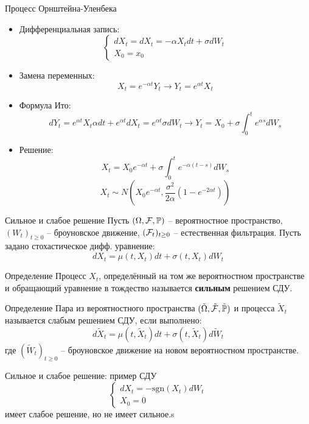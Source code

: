 \documentclass{beamer}
\begin{document}
\begin{frame}{Процесс Орнштейна-Уленбека}
\begin{itemize}
    \item Дифференциальная запись:    
    $$ \begin{cases}
            dX_t = d X_t = -\alpha X_t dt + \sigma dW_t\\
            X_0 = x_0
        \end{cases}
    $$
    \item Замена переменных:
    $$
        X_t = e^{-\alpha t} Y_t \longrightarrow Y_t = e^{\alpha t} X_t
    $$
    \item Формула Ито:
    $$
        dY_t = e^{\alpha t}X_t \alpha dt + e^{\alpha t} dX_t
        = e^{\alpha t}\sigma dW_t \to Y_t = X_0 + \sigma \int_0^t e^{\alpha s}dW_s
    $$
    \item Решение:
    $$
        X_t = X_0 e^{-\alpha t} + \sigma  \int_0^t e^{-\alpha(t-s)}dW_s
    $$
    $$
        X_t \sim N\left(X_0e^{-\alpha t}, \dfrac{\sigma^2}{2\alpha}(1-e^{-2\alpha t})\right)
    $$
\end{itemize}
\end{frame}

\begin{frame}{Сильное и слабое решение}
    Пусть $(\Omega, \mathcal{F}, \mathbb{P})$ -- вероятностное пространство, $(W_t)_{t\geq0}$ -- броуновское движение, $(\mathcal{F}_t)_{t\geq 0}$ -- естественная фильтрация. Пусть задано стохастическое дифф. уравнение:
    $$
        dX_t = \mu(t, X_t) dt + \sigma(t, X_t) dW_t
    $$
    \begin{block}{Определение}
        Процесс $X_t$, определённый на том же вероятностном пространстве и обращающий уравнение в тождество называется \textbf{сильным} решением СДУ.
    \end{block}
    \begin{block}{Определение}
        Пара из вероятностного пространства $(\tilde{\Omega}, \tilde{\mathcal{F}}, \tilde{\mathbb{P}})$ и процесса $\tilde{X}_t$ называется слабым решением СДУ, если выполнено:
        $$d\tilde{X}_t = \mu(t, \tilde{X}_t) dt + \sigma(t, \tilde{X}_t) d\tilde{W}_t$$где $(\tilde{W}_t)_{t\geq 0}$ -- броуновское движение на новом вероятностном пространстве.
    \end{block}
\end{frame}

\begin{frame}{Сильное и слабое решение: пример}
    СДУ 
    $$\begin{cases}
        dX_t = -\mathrm{sgn}(X_t)dW_t 
        \\
        X_0 = 0
    \end{cases}
    $$имеет слабое решение, но не имеет сильное.s
\end{frame}
\end{document}
